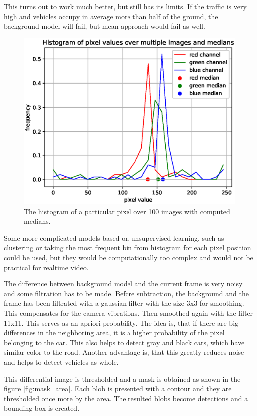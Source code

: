 \documentclass[a4paper,12pt,titlepage, twoside]{article}
\numberwithin{figure}{section}
\begin{document}
This turns out to work much better, but still has its limits. If the traffic is very high and vehicles occupy in average more than half of the ground, the background model will fail, but mean approach would fail as well. 

\begin{figure}[h]
\centering
\includegraphics[width=1\linewidth]{fig/pixel_hist.eps}
\caption{The histogram of a particular pixel over 100 images with computed medians.}
\label{fig:pixel_hist}
\end{figure}

Some more complicated models based on unsupervised learning, such as clustering or taking the most frequent bin from histogram for each pixel position could be used, but they would be computationally too complex and would not be practical for realtime video.

The difference between background model and the current frame is very noisy and some filtration has to be made. Before subtraction, the background and the frame has been filtrated with a gaussian filter with the size 3x3 for smoothing. This compensates for the camera vibrations. Then smoothed again with the filter 11x11. This serves as an apriori probability. The idea is, that if there are big differences in the neighboring area, it is a higher probability of the pixel belonging to the car. This also helps to detect gray and black cars, which have similar color to the road. Another advantage is, that this greatly reduces noise and helps to detect vehicles as whole.

This differential image is thresholded and a mask is obtained as shown in the figure \ref{fig:mask_area}. Each blob is presented with a contour and they are thresholded once more by the area. The resulted blobs become detections and a bounding box is created.
\end{document}
